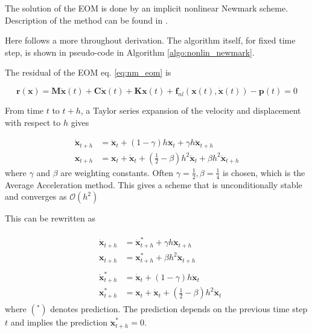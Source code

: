 The solution of the EOM is done by an implicit nonlinear Newmark scheme.
Description of the method can be found in \citep{krenk2009non}.

Here follows a more throughout derivation. The algorithm itself, for fixed time
step, is shown in pseudo-code in Algorithm \ref{algo:nonlin_newmark}.


The residual of the EOM eq. \eqref{eq:nm_eom} is

\begin{equation}
  \label{eq:nm_res}
  \bm r (\bm x) = \bm M \ddot{\bm x}(t) + \bm C \dot{\bm x}(t) + \bm K \bm x(t) +
    \bm f_{nl} \left( \bm x(t), \dot{ \bm x}(t) \right) - \bm p(t) = 0
\end{equation}

From time $t$ to $t+h$, a Taylor series expansion of the velocity and
displacement with respect to $h$ gives

\begin{equation}
  \label{eq:nm_taylor}
  \begin{aligned}
    \dot {\bm x}_{t+h} &= \dot{\bm x}_t + (1-\gamma)h \ddot{\bm x}_t + \gamma h \ddot{\bm x}_{t+h} \\
    {\bm x}_{t+h} &= \bm x_t + \dot{\bm x}_t + (\frac{1}{2}-\beta)h^2 \ddot{\bm x}_t + \beta h^2 \ddot{\bm x}_{t+h}
  \end{aligned}
\end{equation}
where $\gamma$ and $\beta$ are weighting constants. Often $\gamma =\frac{1}{2},
\beta = \frac{1}{4}$ is chosen, which is the Average Acceleration method. This
gives a scheme that is unconditionally stable and converges as
$\mathcal{O}(h^2)$

This can be rewritten as

\begin{align}
  \label{eq:nm_taylor2}
  &\begin{aligned}
    \dot {\bm x}_{t+h} &= \dot{\bm x}^*_{t+h} + \gamma h \ddot{\bm x}_{t+h} \\
    \bm x_{t+h} &= \bm x^*_{t+h} + \beta h^2 \ddot{\bm x}_{t+h}
  \end{aligned} \\
  &\begin{aligned}
    \dot {\bm x}^*_{t+h} &= \dot{\bm x}_t + (1-\gamma)h \ddot{\bm x}_t  \\
    {\bm x}^*_{t+h} &= \bm x_t + \dot{\bm x}_t + (\frac{1}{2}-\beta)h^2 \ddot{\bm x}_t
  \end{aligned}
\end{align}
where $(^*)$ denotes prediction. The prediction depends on the previous time
step $t$ and implies the prediction $\ddot{\bm x}^*_{t+h} = 0$.

